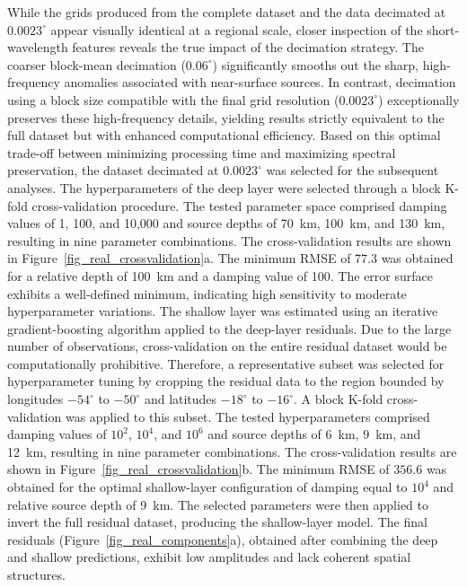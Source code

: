 While the grids produced from the complete dataset and the data decimated at
$0.0023^{\circ}$ appear visually identical at a regional scale, closer inspection
of the short-wavelength features reveals the true impact of the decimation
strategy. The coarser block-mean decimation ($0.06^{\circ}$) significantly
smooths out the sharp, high-frequency anomalies associated with near-surface
sources. In contrast, decimation using a block size compatible with the final
grid resolution ($0.0023^{\circ}$) exceptionally preserves these high-frequency
details, yielding results strictly equivalent to the full dataset but with
enhanced computational efficiency. Based on this optimal trade-off between
minimizing processing time and maximizing spectral preservation, the dataset
decimated at $0.0023^{\circ}$ was selected for the subsequent analyses.
The hyperparameters of the deep layer were selected through a block K-fold
cross-validation procedure. The tested
parameter space comprised damping values of 1, 100, and 10,000 and source
depths of 70~km, 100~km, and 130~km, resulting in nine parameter combinations.
The cross-validation results are shown in
Figure~\ref{fig_real_crossvalidation}a. The minimum RMSE of $77.3$ was obtained for a
relative depth of 100~km and a damping value of 100. The error surface exhibits
a well-defined minimum, indicating high sensitivity to moderate
hyperparameter variations.
The shallow layer was estimated using an iterative gradient-boosting
algorithm applied to the deep-layer residuals.
Due to the large number of observations, cross-validation on the entire
residual dataset would be computationally prohibitive. Therefore, a
representative subset was selected for hyperparameter tuning by cropping the
residual data to the region bounded by longitudes $-54^{\circ}$ to
$-50^{\circ}$ and latitudes $-18^{\circ}$ to $-16^{\circ}$.
A block K-fold cross-validation was applied to this subset.
The tested hyperparameters comprised damping
values of $10^{2}$, $10^{4}$, and $10^{6}$ and source depths of 6~km, 9~km, and
12~km, resulting in nine parameter combinations.
The cross-validation results are shown in
Figure~\ref{fig_real_crossvalidation}b. The minimum RMSE of $356.6$ was obtained for the
optimal shallow-layer configuration of damping equal to $10^4$ and relative
source depth of 9~km.
The selected parameters were then applied to invert the full residual
dataset, producing the shallow-layer model. The final residuals
(Figure~\ref{fig_real_components}a), obtained
after combining the deep and shallow predictions, exhibit low amplitudes and
lack coherent spatial structures.

